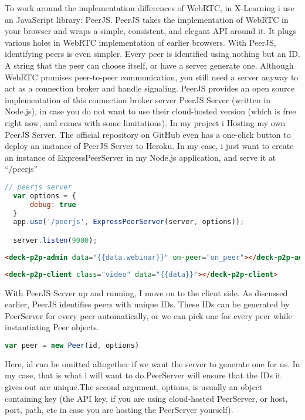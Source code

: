 To work around the implementation differences of WebRTC, in X-Learning i use an JavaScript library: PeerJS.
PeerJS takes the implementation of WebRTC in your browser and wraps a simple, consistent, and elegant API around it. It plugs various holes in WebRTC implementation of earlier browsers. 
With PeerJS, identifying peers is even simpler. Every peer is identified using nothing but an ID. A string that the peer can choose itself, or have a server generate one. Although WebRTC promises peer-to-peer communication, you still need a server anyway to act as a connection broker and handle signaling. PeerJS provides an open source implementation of this connection broker server PeerJS Server (written in Node.js), in case you do not want to use their cloud-hosted version (which is free right now, and comes with some limitations).
In my project i Hosting my own PeerJS Server. The official repository on GitHub even has a one-click button to deploy an instance of PeerJS Server to Heroku.
In my case, i just want to create an instance of ExpressPeerServer in my Node.js application, and serve it at “/peerjs”

\begin{lstlisting}[language=javascript]
// peerjs server
  var options = {
      debug: true
  }
  app.use('/peerjs', ExpressPeerServer(server, options));

  server.listen(9000);
\end{lstlisting}

\begin{lstlisting}[language=html]
 <deck-p2p-admin data="{{data.webinar}}" on-peer="on_peer"></deck-p2p-admin>
\end{lstlisting}

\begin{lstlisting}[language=html]
  <deck-p2p-client class="video" data="{{data}}"></deck-p2p-client>
\end{lstlisting}

With PeerJS Server up and running, I move on to the client side. As discussed earlier, PeerJS identifies peers with unique IDs. These IDs can be generated by PeerServer for every peer automatically, or we can pick one for every peer while instantiating Peer objects.

\begin{lstlisting}[language=javascript]
var peer = new Peer(id, options)
\end{lstlisting}

Here, id can be omitted altogether if we want the server to generate one for us. In my case, that is what i will want to do.PeerServer will ensure that the IDs it gives out are unique.The second argument, options, is usually an object containing key (the API key, if you are using cloud-hosted PeerServer, or host, port, path, etc in case you are hosting the PeerServer yourself).

